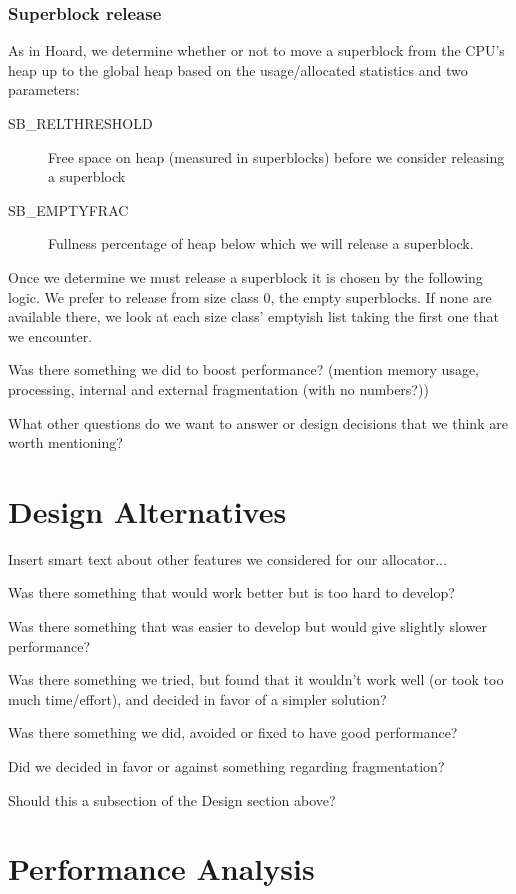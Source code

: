 \documentclass{article}
\begin{document}
\subsubsection{Superblock release}
As in Hoard, we determine whether or not to move a superblock from the CPU's
heap up to the global heap based on the usage/allocated statistics and
two parameters: 
\begin{description}
    \item[SB\_RELTHRESHOLD] Free space on heap (measured in superblocks)
        before we consider releasing a superblock
    \item[SB\_EMPTYFRAC] Fullness percentage of heap below which we will
        release a superblock.
\end{description}

Once we determine we must release a superblock it is chosen by the following
logic. We prefer to release from size class 0, the empty superblocks. If none
are available there, we look at each size class' emptyish list taking the
first one that we encounter.

Was there something we did to boost performance? (mention memory usage, 
processing, internal and external fragmentation (with no numbers?))

What other questions do we want to answer or design decisions that we think
are worth mentioning?

\newpage
\section{Design Alternatives}
\label{sec:alternatives}

Insert smart text about other features we considered for our allocator...

Was there something that would work better but is too hard to develop?

Was there something that was easier to develop but would give slightly slower
performance?

Was there something we tried, but found that it wouldn't work well (or took too 
much time/effort), and decided in favor of a simpler solution?

Was there something we did, avoided or fixed to have good performance?

Did we decided in favor or against something regarding fragmentation?

Should this a subsection of the Design section above?

\newpage
\section{Performance Analysis}
\label{sec:performance}
\end{document}

